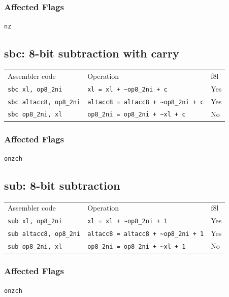 \documentclass{book}
\begin{document}
\subsubsection*{Affected Flags}

\texttt{nz}


\subsection{sbc: 8-bit subtraction with carry}

\begin{tabular}{l l l}
Assembler code                 & Operation                                     & f8l \\
\texttt{sbc xl, op8\_2ni}      & \texttt{xl = xl + \~{}op8\_2ni + c}           & Yes \\
\texttt{sbc altacc8, op8\_2ni} & \texttt{altacc8 = altacc8 + \~{}op8\_2ni + c} & Yes \\
\texttt{sbc op8\_2ni, xl}      & \texttt{op8\_2ni = op8\_2ni + \~{}xl + c}     & No
\end{tabular}

\subsubsection*{Affected Flags}

\texttt{onzch}


\subsection{sub: 8-bit subtraction}

\begin{tabular}{l l l}
Assembler code                 & Operation                                     & f8l \\
\texttt{sub xl, op8\_2ni}      & \texttt{xl = xl + \~{}op8\_2ni + 1}           & Yes \\
\texttt{sub altacc8, op8\_2ni} & \texttt{altacc8 = altacc8 + \~{}op8\_2ni + 1} & Yes \\
\texttt{sub op8\_2ni, xl}      & \texttt{op8\_2ni = op8\_2ni + \~{}xl + 1}     & No
\end{tabular}

\subsubsection*{Affected Flags}

\texttt{onzch}
\end{document}
